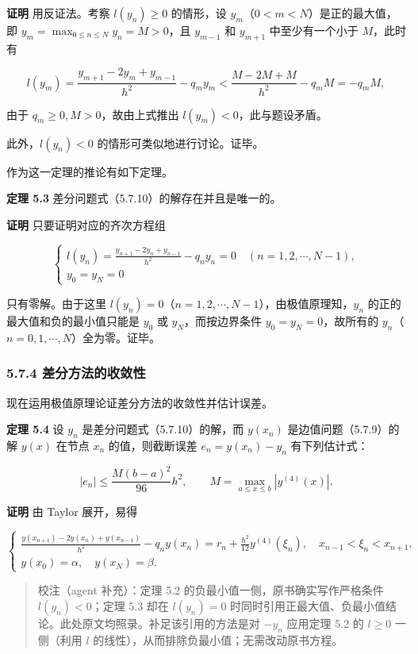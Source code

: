 \textbf{证明} 用反证法。考察 \(l(y_n)\ge0\) 的情形，设 \(y_m\)（\(0<m<N\)）是正的最大值，即 \(y_m=\max_{0\le n\le N}y_n=M>0\)，且 \(y_{m-1}\) 和 \(y_{m+1}\) 中至少有一个小于 \(M\)，此时有

\[
l(y_m)=\frac{y_{m+1}-2y_m+y_{m-1}}{h^2}-q_my_m<\frac{M-2M+M}{h^2}-q_mM=-q_mM,
\]

由于 \(q_m\ge0,M>0\)，故由上式推出 \(l(y_m)<0\)，此与题设矛盾。

此外，\(l(y_n)<0\) 的情形可类似地进行讨论。证毕。

作为这一定理的推论有如下定理。

\textbf{定理 5.3} 差分问题式（5.7.10）的解存在并且是唯一的。

\textbf{证明} 只要证明对应的齐次方程组

\[
\begin{cases}
\displaystyle l(y_n)=\frac{y_{n+1}-2y_n+y_{n-1}}{h^2}-q_ny_n=0\quad(n=1,2,\cdots,N-1),\\[6pt]
y_0=y_N=0
\end{cases}
\]

只有零解。由于这里 \(l(y_n)=0\)（\(n=1,2,\cdots,N-1\)），由极值原理知，\(y_n\) 的正的最大值和负的最小值只能是 \(y_0\) 或 \(y_N\)，而按边界条件 \(y_0=y_N=0\)，故所有的 \(y_n\)（\(n=0,1,\cdots,N\)）全为零。证毕。

\subsubsection{5.7.4 差分方法的收敛性}\label{ch05b-ux5deeux5206ux65b9ux6cd5ux7684ux6536ux655bux6027}

现在运用极值原理论证差分方法的收敛性并估计误差。

\textbf{定理 5.4} 设 \(y_n\) 是差分问题式（5.7.10）的解，而 \(y(x_n)\) 是边值问题（5.7.9）的解 \(y(x)\) 在节点 \(x_n\) 的值，则截断误差 \(e_n=y(x_n)-y_n\) 有下列估计式：

\[
|e_n|\le\frac{M(b-a)^2}{96}h^2,\qquad
M=\max_{a\le x\le b}|y^{(4)}(x)|.
\tag{5.7.11}
\]

\textbf{证明} 由 Taylor 展开，易得

\[
\begin{cases}
\displaystyle\frac{y(x_{n+1})-2y(x_n)+y(x_{n-1})}{h^2}-q_ny(x_n)=r_n+\frac{h^2}{12}y^{(4)}(\xi_n),\quad x_{n-1}<\xi_n<x_{n+1},\\[6pt]
y(x_0)=\alpha,\quad y(x_N)=\beta.
\end{cases}
\tag{5.7.12}
\]

\begin{quote}
校注（agent 补充）：定理 5.2 的负最小值一侧，原书确实写作严格条件 \(l(y_n)<0\)；定理 5.3 却在 \(l(y_n)=0\) 时同时引用正最大值、负最小值结论。此处原文均照录。补足该引用的方法是对 \(-y_n\) 应用定理 5.2 的 \(l\ge0\) 一侧（利用 \(l\) 的线性），从而排除负最小值；无需改动原书方程。
\end{quote}


